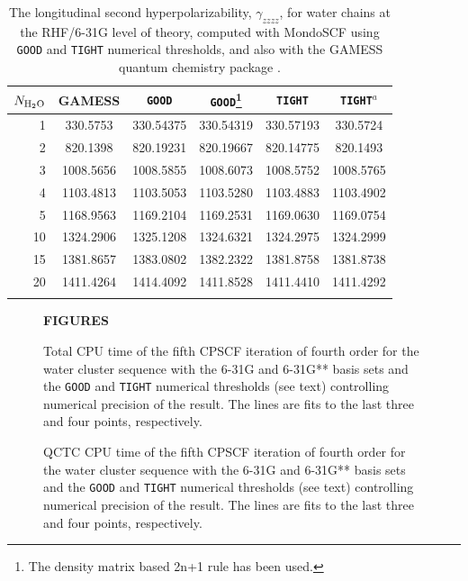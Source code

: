\documentclass[prl,twocolumn,showpacs,twocolumngrid,superbib]{revtex4}
\begin{document}
{\begin{table}[h]
  \centering
  \caption{\protect
    The longitudinal second hyperpolarizability, $\gamma_{zzzz}$,
    for water chains at the RHF/6-31G level of theory, computed with 
    {\sc MondoSCF} using {\tt GOOD} and {\tt TIGHT} numerical thresholds, 
    and also with the {\sc GAMESS} quantum chemistry package \cite{gamess}.
  }\label{tab:Gamma_1D_Values}
  \begin{tabular}{rccccc}
    \toprule
    $N_{\rm H_2 O}$ &\multicolumn{1}{c}{{\sc GAMESS}}
    &\multicolumn{1}{c}{{\tt GOOD}}
    &\multicolumn{1}{c}{{\tt GOOD}\footnote[1]{The density matrix based 2n+1 rule has been used.}}
    &\multicolumn{1}{c}{{\tt TIGHT}}
    &\multicolumn{1}{c}{{\tt TIGHT}$^a$} \\
    \hline
     1 &  330.5753 & 330.54375 & 330.54319 & 330.57193 &  330.5724 \\
     2 &  820.1398 & 820.19231 & 820.19667 & 820.14775 &  820.1493 \\
     3 & 1008.5656 & 1008.5855 & 1008.6073 & 1008.5752 & 1008.5765 \\
     4 & 1103.4813 & 1103.5053 & 1103.5280 & 1103.4883 & 1103.4902 \\
     5 & 1168.9563 & 1169.2104 & 1169.2531 & 1169.0630 & 1169.0754 \\
    10 & 1324.2906 & 1325.1208 & 1324.6321 & 1324.2975 & 1324.2999 \\
    15 & 1381.8657 & 1383.0802 & 1382.2322 & 1381.8758 & 1381.8738 \\
    20 & 1411.4264 & 1414.4092 & 1411.8528 & 1411.4410 & 1411.4292 \\
    \botrule
  \end{tabular}
\end{table}

\clearpage

\begin{figure}[h]
\begin{center}
\bf  FIGURES\\[1.cm]
\end{center}

  \caption{\protect
    Total CPU time of the fifth CPSCF iteration of fourth order for
    the water cluster sequence with the 6-31G and 6-31G** 
    basis sets and the {\tt GOOD} and {\tt TIGHT} 
    numerical thresholds (see text) controlling numerical
    precision of the result. The lines are fits to the 
    last three and four points, respectively.
  }\label{fig:Gamma_scaling}

  \caption{\protect
    QCTC CPU time of the fifth CPSCF iteration of fourth order for
    the water cluster sequence with the 6-31G and 6-31G** 
    basis sets and the {\tt GOOD} and {\tt TIGHT} 
    numerical thresholds (see text) controlling numerical
    precision of the result. The lines are fits to the 
    last three and four points, respectively.
  }\label{fig:Gamma_QCTC_Timing}


\end{figure}}
\end{document}
